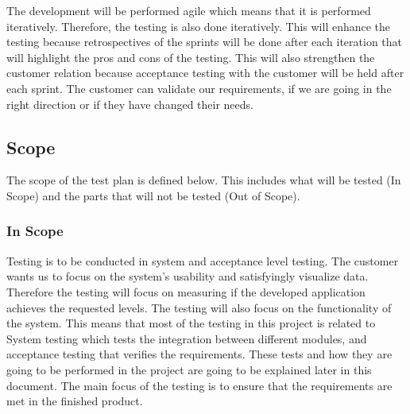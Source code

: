 \noindent The development will be performed agile which means that it is performed iteratively. Therefore, the testing is also done iteratively. This will enhance the testing because retrospectives of the sprints will be done after each iteration that will highlight the pros and cons of the testing. This will also strengthen the customer relation because acceptance testing with the customer will be held after each sprint. The customer can validate our requirements, if we are going in the right direction or if they have changed their needs.
\newline

\subsection{Scope}
The scope of the test plan is defined below. This includes what will be tested (In Scope) and the parts that will not be tested (Out of Scope).  

\subsubsection{In Scope}
Testing is to be conducted in system and acceptance level testing. The customer wants us to focus on the system's usability and satisfyingly visualize data.  Therefore the testing will focus on measuring if the developed application achieves the requested levels. The testing will also focus on the functionality of the system. This means that most of the testing in this project is related to System testing which tests the integration between different modules, and acceptance testing that verifies the requirements. These tests and how they are going to be performed in the project are going to be explained later in this document. The main focus of the testing is to ensure that the requirements are met in the finished product. 
